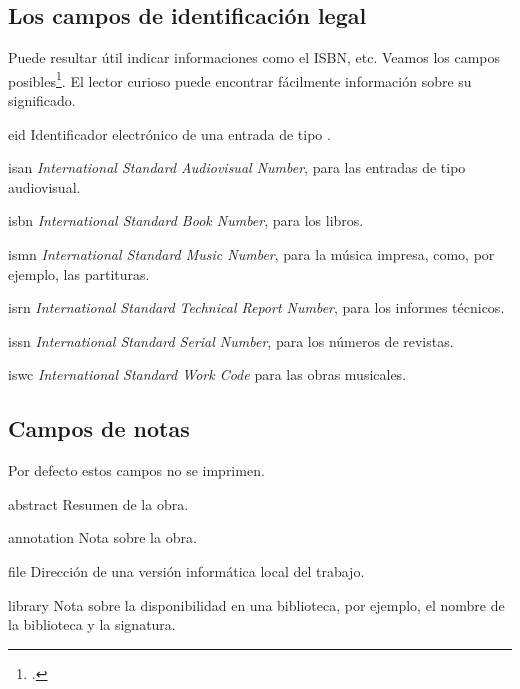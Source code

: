 \subsection{Los campos de identificación legal}

Puede resultar útil indicar informaciones como el ISBN, etc. Veamos
los campos posibles\footcite[Por defecto,  imprime
estos campo si se rellenan. Pero siempre se puede impedir que que se
vean, pasando la opción  cuando se carga el
package, véase:][]{biblatex_isbn}.  El lector curioso puede encontrar
fácilmente información sobre su significado.

\begin{choix}
	\item[eid] Identificador electrónico de una entrada de tipo . 
   	\item[isan] \emph{\textenglish{International Standard
              Audiovisual Number}}, para las entradas de tipo audiovisual.
   	\item[isbn] \emph{\textenglish{International Standard Book
              Number}}, para los libros. 
   	\item[ismn] \emph{\textenglish{International Standard Music
              Number}}, para la música impresa, como, por ejemplo, las
          partituras. 
   	\item[isrn] \emph{\textenglish{International Standard
              Technical Report Number}}, para los informes técnicos. 
   	\item[issn] \emph{\textenglish{International Standard Serial
              Number}}, para los números de revistas. 
   	\item[iswc] \emph{\textenglish{International Standard Work
              Code}} para las obras musicales.
\end{choix}

\subsection{Campos de notas}

Por defecto estos campos no se imprimen. 

\begin{choix}
	\item[abstract] Resumen de la obra. 
   	\item[annotation] Nota sobre la obra.
   	\item[file] Dirección de una versión informática local del trabajo. 
   	\item[library] Nota sobre la disponibilidad en una biblioteca,
          por ejemplo, el nombre de la biblioteca y la signatura.
\end{choix}

